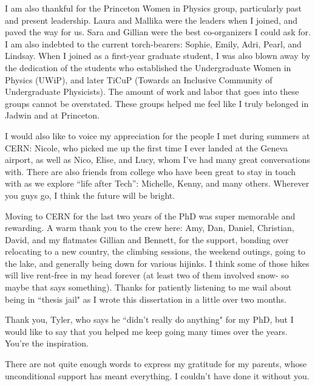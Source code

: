 I am also thankful for the Princeton Women in Physics group, particularly past and present leadership. Laura and Mallika were the leaders when I joined, and paved the way for us. Sara and Gillian were the best co-organizers I could ask for. I am also indebted to the current torch-bearers: Sophie, Emily, Adri, Pearl, and Lindsay. When I joined as a first-year graduate student, I was also blown away by the dedication of the students who established the Undergraduate Women in Physics (UWiP), and later TiCuP (Towards an Inclusive Community of Undergraduate Physicists). The amount of work and labor that goes into these groups cannot be overstated. These groups helped me feel like I truly belonged in Jadwin and at Princeton.

I would also like to voice my appreciation for the people I met during summers at CERN: Nicole, who picked me up the first time I ever landed at the Geneva airport, as well as Nico, Elise, and Lucy, whom I've had many great conversations with. There are also friends from college who have been great to stay in touch with as we explore “life after Tech”: Michelle, Kenny, and many others. Wherever you guys go, I think the future will be bright.

Moving to CERN for the last two years of the PhD was super memorable and rewarding. A warm thank you to the crew here: Amy, Dan, Daniel, Christian, David, and my flatmates Gillian and Bennett, for the support, bonding over relocating to a new country, the climbing sessions, the weekend outings, going to the lake, and generally being down for various hijinks. I think some of those hikes will live rent-free in my head forever (at least two of them involved snow- so maybe that says something). Thanks for patiently listening to me wail about being in ``thesis jail" as I wrote this dissertation in a little over two months.

Thank you, Tyler, who says he ``didn't really do anything" for my PhD, but I would like to say that you helped me keep going many times over the years. You're the inspiration.

There are not quite enough words to express my gratitude for my parents, whose unconditional support has meant everything. I couldn't have done it without you.
